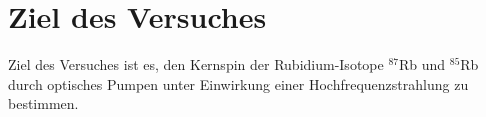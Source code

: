 \section{Ziel des Versuches}
\label{sec:versuchsziel}

Ziel des Versuches ist es, den Kernspin der Rubidium-Isotope $^{87}$Rb und $^{85}$Rb durch optisches Pumpen unter Einwirkung einer Hochfrequenzstrahlung zu bestimmen.